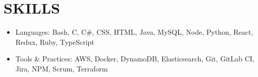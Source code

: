 \section{SKILLS}
\begin{itemize}
   \setlength\itemsep{-0.25em}
   \item{
     Languages: Bash, C, C\#, CSS, HTML, Java, MySQL, Node, Python, React, Redux, Ruby, TypeScript
   }
   \item{
     Tools \& Practices: AWS, Docker, DynamoDB, Elasticsearch, Git, GitLab CI, Jira, NPM, Scrum, Terraform
   }
\end{itemize}
